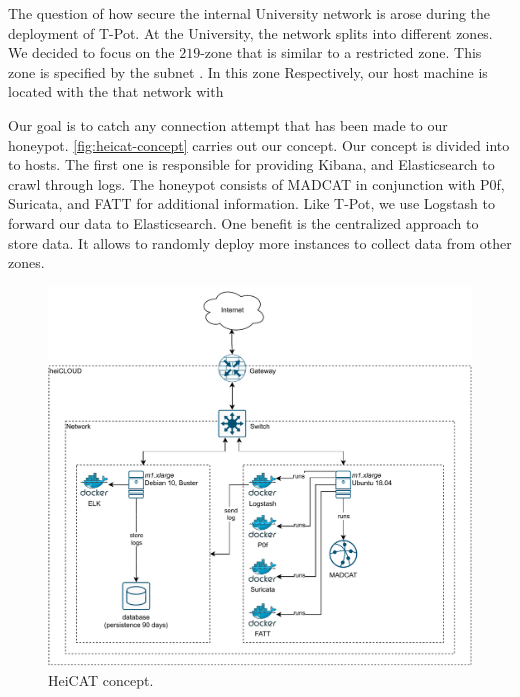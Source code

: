 The question of how secure the internal University network is arose during the deployment of T-Pot.
At the University, the network splits into different zones.
We decided to focus on the $219$-zone that is similar to a restricted zone.
This zone is specified by the subnet .
In this zone 
Respectively, our host machine is located with the that network with 

Our goal is to catch any connection attempt that has been made to our honeypot.
\autoref{fig:heicat-concept} carries out our concept.
Our concept is divided into to hosts.
The first one is responsible for providing Kibana, and Elasticsearch to crawl through logs.
The honeypot consists of MADCAT in conjunction with P0f, Suricata, and FATT for additional information.
Like T-Pot, we use Logstash to forward our data to Elasticsearch.
One benefit is the centralized approach to store data.
It allows to randomly deploy more instances to collect data from other zones.

\begin{figure}[ht]
    \centering
    \includegraphics[width=\textwidth]{figures/heicat-conecpt.pdf}
    \caption[HeiCAT concept]{HeiCAT concept.}
    \label{fig:heicat-concept}
\end{figure}


